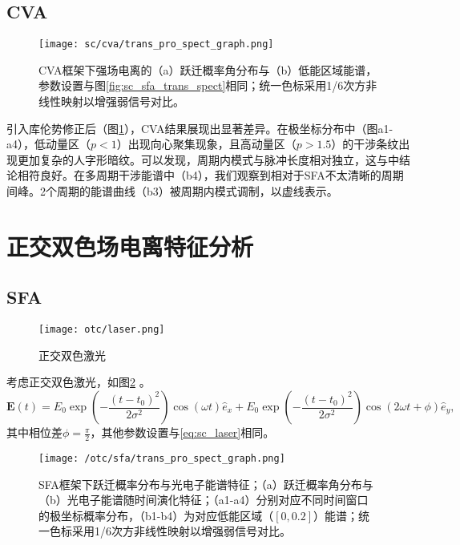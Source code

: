 \subsection{CVA}

\begin{figure}[!htbp]  %
	\centering
	\texttt{[image: sc/cva/trans\_pro\_spect\_graph.png]}
	\caption{CVA框架下强场电离的（a）跃迁概率角分布与（b）低能区域能谱，参数设置与图\ref{fig:sc_sfa_trans_spect}相同；统一色标采用1/6次方非线性映射以增强弱信号对比。}
	\label{fig:sc_cva_trans_spect}
\end{figure}

引入库伦势修正后（图\ref{fig:sc_cva_trans_spect}），CVA结果展现出显著差异。在极坐标分布中（图a1-a4），低动量区（$p<1$）出现向心聚集现象，且高动量区（$p>1.5$）的干涉条纹出现更加复杂的人字形暗纹。可以发现，周期内模式与脉冲长度相对独立，这与中结论相符良好。在多周期干涉能谱中（b4），我们观察到相对于SFA不太清晰的周期间峰。2个周期的能谱曲线（b3）被周期内模式调制，以虚线表示。

%
\section{正交双色场电离特征分析}
\subsection{SFA}

\begin{figure}[!htbp]  %
	\centering
	\texttt{[image: otc/laser.png]}
	\caption{正交双色激光}
	\label{fig:otc_laser}
\end{figure}

考虑正交双色激光，如图\ref{fig:otc_laser} 。
\begin{equation}
\mathbf{E}(t) = E_0 \exp\left(-\frac{(t - t_0)^2}{2\sigma^2}\right) \cos(\omega t) \hat e_x + E_0 \exp\left(-\frac{(t - t_0)^2}{2\sigma^2}\right) \cos(2 \omega t + \phi) \hat e_y,
\label{eq:otc_laser}
\end{equation}
其中相位差$\phi = \frac{\pi}{2}$，其他参数设置与\ref{eq:sc_laser}相同。

\begin{figure}[!htbp]  %
	\centering
	\texttt{[image: /otc/sfa/trans\_pro\_spect\_graph.png]}
	\caption{SFA框架下跃迁概率分布与光电子能谱特征；（a）跃迁概率角分布与（b）光电子能谱随时间演化特征；（a1-a4）分别对应不同时间窗口的极坐标概率分布，（b1-b4）为对应低能区域（$[0, 0.2]$）能谱；统一色标采用1/6次方非线性映射以增强弱信号对比。}
	\label{fig:otc_sfa_trans_spect}
\end{figure}


